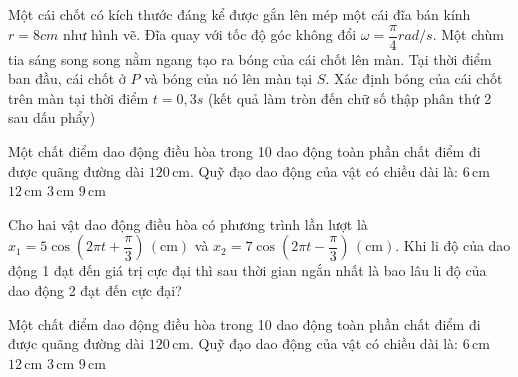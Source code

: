 \begin{ex}
Một cái chốt có kích thước đáng kể được gắn lên mép một cái đĩa bán kính $r=8cm$ như hình vẽ. Đĩa quay với tốc độ góc không đổi $\omega =\dfrac{\pi }{4}rad/s.$ Một chùm tia sáng song song nằm ngang tạo ra bóng của cái chốt lên màn. Tại thời điểm ban đầu, cái chốt ở $P$ và bóng của nó lên màn tại $S$. Xác định bóng của cái chốt trên màn tại thời điểm $t=0,3s$ (kết quả làm tròn đến chữ số thập phân thứ 2 sau dấu phẩy)
\end{ex}

\begin{ex}
Một chất điểm dao động điều hòa trong 10 dao động toàn phần chất điểm đi được quãng đường dài $120\,\text{cm}$. Quỹ đạo dao động của vật có chiều dài là:
\choice
{\True $6\,\text{cm}$}
{$12\,\text{cm}$}
{$3\,\text{cm}$}
{$9\,\text{cm}$}
\end{ex}

\begin{ex}
Cho hai vật dao động điều hòa có phương trình lần lượt là $x_1 = 5\cos \left( 2\pi t + \dfrac{\pi}{3} \right)\,(\text{cm})$ và $x_2 = 7\cos \left( 2\pi t - \dfrac{\pi}{3} \right)\,(\text{cm})$. Khi li độ của dao động 1 đạt đến giá trị cực đại thì sau thời gian ngắn nhất là bao lâu li độ của dao động 2 đạt đến cực đại?
\end{ex}

\begin{ex}
Một chất điểm dao động điều hòa trong 10 dao động toàn phần chất điểm đi được quãng đường dài $120\,\text{cm}$. Quỹ đạo dao động của vật có chiều dài là:
\choice
{\True $6\,\text{cm}$}
{$12\,\text{cm}$}
{$3\,\text{cm}$}
{$9\,\text{cm}$}
\end{ex}

